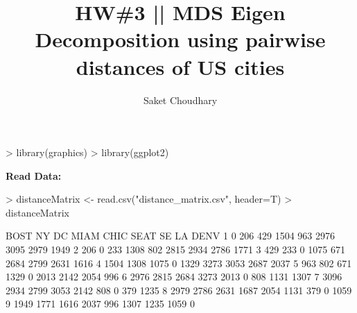 \documentclass{article}
\begin{document}


\title{HW\#3 ||  MDS  Eigen Decomposition using pairwise distances of US cities}
\author{Saket Choudhary}
\maketitle

\begin{Schunk}
\begin{Sinput}
> library(graphics)
> library(ggplot2)
\end{Sinput}
\end{Schunk}

\textbf{Read Data:}
\begin{Schunk}
\begin{Sinput}
> distanceMatrix <- read.csv("distance_matrix.csv", header=T)
> distanceMatrix
\end{Sinput}
\begin{Soutput}
  BOST   NY   DC MIAM CHIC SEAT   SE   LA DENV
1    0  206  429 1504  963 2976 3095 2979 1949
2  206    0  233 1308  802 2815 2934 2786 1771
3  429  233    0 1075  671 2684 2799 2631 1616
4 1504 1308 1075    0 1329 3273 3053 2687 2037
5  963  802  671 1329    0 2013 2142 2054  996
6 2976 2815 2684 3273 2013    0  808 1131 1307
7 3096 2934 2799 3053 2142  808    0  379 1235
8 2979 2786 2631 1687 2054 1131  379    0 1059
9 1949 1771 1616 2037  996 1307 1235 1059    0
\end{Soutput}
\end{Schunk}
\end{document}
